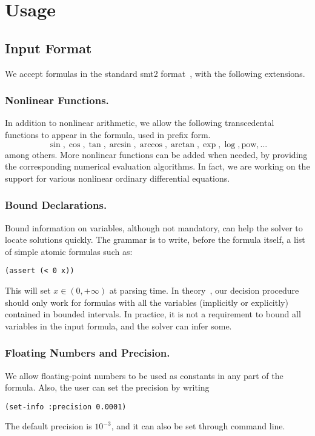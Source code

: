 \documentclass[envcountsect]{llncs}
\begin{document}
\section{Usage}

\subsection{Input Format}

We accept formulas in the standard {\sf smt2} format~\cite{}, with the following
extensions. 

\subsubsection{Nonlinear Functions.} In addition to nonlinear arithmetic, we
allow the following transcedental functions to appear in the formula, used in
prefix form.
 $$\sin, \cos, \tan, \arcsin, \arccos, \arctan, \exp, \log, \mbox{pow}, ... $$
among others. More nonlinear functions can be added when needed, by providing
the corresponding numerical evaluation algorithms. In fact, we are working on
the support for various nonlinear ordinary differential equations. 
 
\subsubsection{Bound Declarations.} Bound information on variables, although not
mandatory, can help the solver to locate solutions quickly. The grammar is to
write, before the formula itself, a list of simple atomic formulas such as:
\begin{verbatim}
(assert (< 0 x)) 
\end{verbatim}
This will set $x\in (0, +\infty)$ at parsing time. In theory~\cite{}, our
decision procedure should only work for formulas with all the variables
(implicitly or explicitly) contained in bounded intervals. In practice, it is
not a requirement to bound all variables in the input formula, and the solver
can infer some. 

\subsubsection{Floating Numbers and Precision.} We allow floating-point numbers
to be used as constants in any part of the formula. Also, the user can set the
precision by writing
\begin{verbatim}
(set-info :precision 0.0001) 
\end{verbatim}
The default precision is $10^{-3}$, and it can also be set through command
line.  
\end{document}
